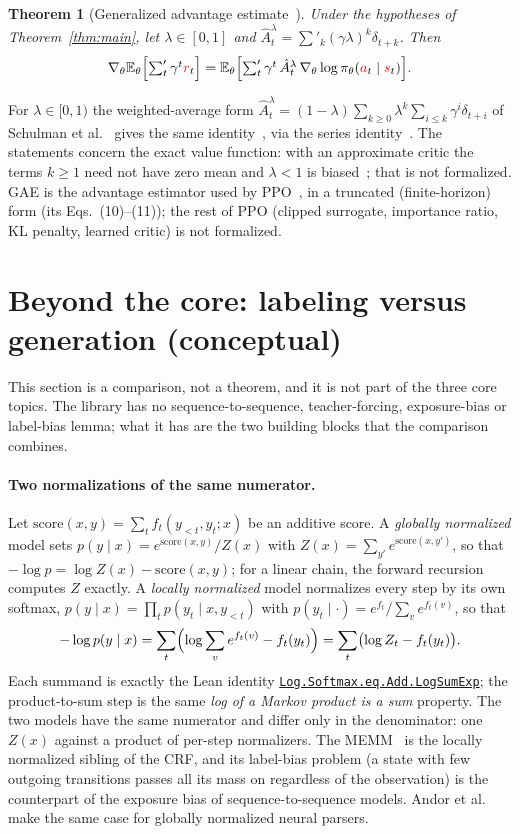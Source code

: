 \documentclass[11pt,a4paper]{article}
\newcommand{\lmod}[2]{\href{http://www.lemma.cn/lean/?module=#2}{\nolinkurl{#1}}}
\newtheorem{theorem}{Theorem}[section]
\newcommand{\E}{\mathbb{E}}
\newcommand{\rv}[1]{{\color{red}#1}}       %
\newcommand{\sv}{\rv{s}}
\newcommand{\av}{\rv{a}}
\newcommand{\rw}{\rv{r}}
\newcommand{\grad}{\nabla_{\theta}}
\newcommand{\tsum}{\textstyle\sum'}
\begin{document}
\begin{theorem}[Generalized advantage estimate~\cite{lemma_gae}]
\label{thm:gae}
Under the hypotheses of Theorem~\ref{thm:main}, let $\lambda\in[0,1]$ and $\hat A^{\lambda}_t=\tsum_k(\gamma\lambda)^k\delta_{t+k}$.
Then
\[
\grad\E_\theta\Bigl[\tsum_t\gamma^t\rw_t\Bigr]=\E_\theta\Bigl[\tsum_t\gamma^t\,\hat A^{\lambda}_t\,\grad\log\pi_\theta(\av_t\mid\sv_t)\Bigr].
\]
\end{theorem}
For $\lambda\in[0,1)$ the weighted-average form $\hat A^{\lambda}_t=(1-\lambda)\sum_{k\ge0}\lambda^k\sum_{i\le k}\gamma^i\delta_{t+i}$ of Schulman et al.~\cite{schulman2016gae} gives the same identity~\cite{lemma_gae_avg}, via the series identity~\cite{lemma_gae_series}.
The statements concern the exact value function: with an approximate critic the terms $k\ge1$ need not have zero mean and $\lambda<1$ is biased~\cite{schulman2016gae}; that is not formalized.
GAE is the advantage estimator used by PPO~\cite{schulman2017ppo}, in a truncated (finite-horizon) form (its Eqs.~(10)--(11)); the rest of PPO (clipped surrogate, importance ratio, KL penalty, learned critic) is not formalized.

\section{Beyond the core: labeling versus generation (conceptual)}
\label{sec:gen}

This section is a comparison, not a theorem, and it is not part of the three core topics.
The library has no sequence-to-sequence, teacher-forcing, exposure-bias or label-bias lemma; what it has are the two building blocks that the comparison combines.

\paragraph{Two normalizations of the same numerator.}
Let $\mathrm{score}(x,y)=\sum_tf_t(y_{<t},y_t;x)$ be an additive score.
A \emph{globally normalized} model sets $p(y\mid x)=e^{\mathrm{score}(x,y)}/Z(x)$ with $Z(x)=\sum_{y'}e^{\mathrm{score}(x,y')}$, so that $-\log p=\log Z(x)-\mathrm{score}(x,y)$; for a linear chain, the forward recursion computes $Z$ exactly.
A \emph{locally normalized} model normalizes every step by its own softmax, $p(y\mid x)=\prod_tp(y_t\mid x,y_{<t})$ with $p(y_t\mid\cdot)=e^{f_t}/\sum_ve^{f_t(v)}$, so that
\[
-\log p(y\mid x)=\sum_t\Bigl(\log\sum_ve^{f_t(v)}-f_t(y_t)\Bigr)=\sum_t\bigl(\log Z_t-f_t(y_t)\bigr).
\]
Each summand is exactly the Lean identity \lmod{Log.Softmax.eq.Add.LogSumExp}{Tensor.Log.Softmax.eq.Add.LogSumExp}; the product-to-sum step is the same \emph{log of a Markov product is a sum} property.
The two models have the same numerator and differ only in the denominator: one $Z(x)$ against a product of per-step normalizers.
The MEMM~\cite{mccallum2000memm} is the locally normalized sibling of the CRF, and its label-bias problem (a state with few outgoing transitions passes all its mass on regardless of the observation) is the counterpart of the exposure bias of sequence-to-sequence models.
Andor et al.~\cite{andor2016global} make the same case for globally normalized neural parsers.
\end{document}
